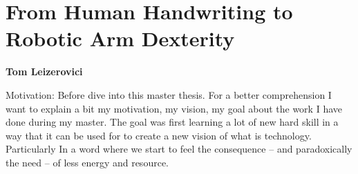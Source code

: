 \chapter*{\centering \Huge From Human Handwriting to\\
Robotic Arm Dexterity}

\begin{center}
    \textbf{Tom Leizerovici}  
\end{center}
Motivation: Before dive into this master thesis. For a better comprehension I want to explain a bit my motivation, my vision, my goal about the work I have done during my master. The goal was first learning a lot of new hard skill in a way that it can be used for to create a new vision of what is technology. Particularly In a word where we start to feel the consequence -- and paradoxically the need -- of less energy and resource. 



\pagebreak

